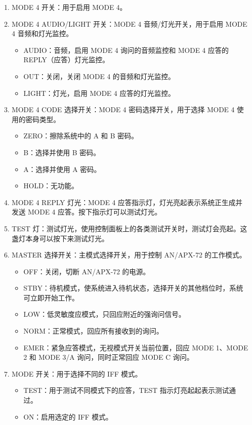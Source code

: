 \begin{enumerate}
  \item MODE 4 开关：用于启用 MODE 4。
  \item MODE 4 AUDIO/LIGHT 开关：MODE 4 音频/灯光开关，用于启用 MODE 4 音频和灯光监控。
  \begin{itemize}
    \item AUDIO：音频，启用 MODE 4 询问的音频监控和 MODE 4 应答的 REPLY（应答）灯光监控。
    \item OUT：关闭，关闭 MODE 4 的音频和灯光监控。
    \item LIGHT：灯光，启用 MODE 4 应答的灯光监控。
  \end{itemize}
  \item MODE 4 CODE 选择开关：MODE 4 密码选择开关，用于选择 MODE 4 使用的密码类型。
  \begin{itemize}
    \item ZERO：擦除系统中的 A 和 B 密码。
    \item B：选择并使用 B 密码。
    \item A：选择并使用 A 密码。
    \item HOLD：无功能。
  \end{itemize} 
  \item MODE 4 REPLY 灯光：MODE 4 应答指示灯，灯光亮起表示系统正生成并发送 MODE 4 应答。按下指示灯可以测试灯光。
  \item TEST 灯：测试灯光，使用控制面板上的各类测试开关时，测试灯会亮起。这盏灯本身可以按下来测试灯光。
  \item MASTER 选择开关：主模式选择开关，用于控制 AN/APX-72 的工作模式。
  \begin{itemize}
    \item OFF：关闭，切断 AN/APX-72 的电源。
    \item STBY：待机模式，使系统进入待机状态，选择开关的其他档位时，系统可立即开始工作。
    \item LOW：低灵敏度应模式，只回应附近的强询问信号。
    \item NORM：正常模式，回应所有接收到的询问。
    \item EMER：紧急应答模式，无视模式开关当前位置，回应 MODE 1、MODE 2 和 MODE 3/A 询问，同时正常回应 MODE C 询问。
  \end{itemize}
  \item MODE 开关：用于选择不同的 IFF 模式。
  \begin{itemize}
    \item TEST：用于测试不同模式下的应答，TEST 指示灯亮起起表示测试通过。
    \item ON：启用选定的 IFF 模式。

\end{itemize}
\end{enumerate}
